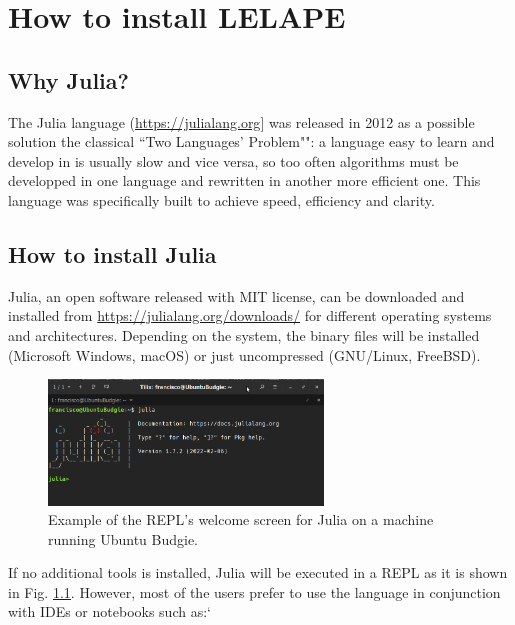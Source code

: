 \chapter{How to install LELAPE}
\section{Why Julia?}
The Julia language (\href{https://julialang.org}{https://julialang.org}] was released in 2012 as a possible solution the classical ``Two Languages' Problem"": a language easy to learn and develop in is usually slow and vice versa, so too often algorithms must be developped in one language and rewritten in another more efficient one. This language was specifically built to achieve speed, efficiency and clarity.

\section{How to install Julia}
%
Julia, an open software released with MIT license, can be downloaded and installed from \href{https://julialang.org/downloads/}{https://julialang.org/downloads/} for different operating systems and architectures. Depending on the system, the binary files will be installed (Microsoft Windows, macOS) or just uncompressed (GNU/Linux, FreeBSD). 

\begin{figure}
	\centering
	\includegraphics[width=0.65\textwidth]{fig/Julia_REPL}
	\caption{Example of the REPL's welcome screen for Julia on a machine running Ubuntu Budgie.}
	\label{Fig;JuliaREPL}
\end{figure}
%
If no additional tools is installed, Julia will be executed in a REPL as it is shown in Fig. \ref{Fig;JuliaREPL}. However, most of the users prefer to use the language in conjunction with IDEs or notebooks such as:`

